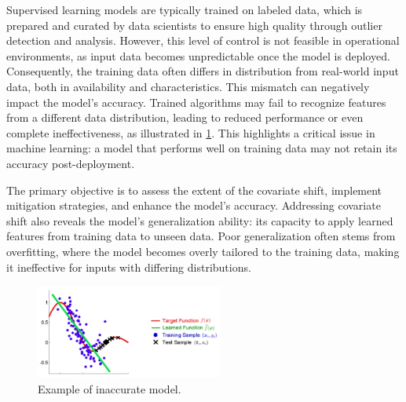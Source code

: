 Supervised learning models are typically trained on labeled data, which is prepared and curated by data scientists to ensure high quality through outlier detection and analysis. However, this level of control is not feasible in operational environments, as input data becomes unpredictable once the model is deployed. Consequently, the training data often differs in distribution from real-world input data, both in availability and characteristics. This mismatch can negatively impact the model's accuracy. Trained algorithms may fail to recognize features from a different data distribution, leading to reduced performance or even complete ineffectiveness, as illustrated in \cref{fig:inaccurate-model}. This highlights a critical issue in machine learning: a model that performs well on training data may not retain its accuracy post-deployment.

The primary objective is to assess the extent of the covariate shift, implement mitigation strategies, and enhance the model's accuracy. Addressing covariate shift also reveals the model's generalization ability: its capacity to apply learned features from training data to unseen data. Poor generalization often stems from overfitting, where the model becomes overly tailored to the training data, making it ineffective for inputs with differing distributions.

\begin{figure}[H]
	\centering
	\includegraphics[width=0.55\textwidth]{assets/covariate_shift.png} 
	\caption{Example of inaccurate model.}
	\label{fig:inaccurate-model}
\end{figure}
